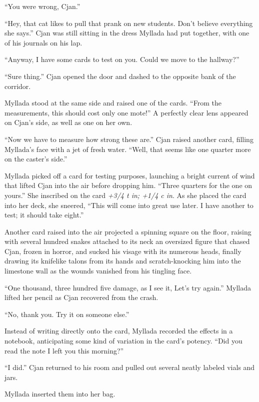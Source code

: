 \centeredstars

``You were wrong, Cjan.''

``Hey, that cat likes to pull that prank on new students. Don't believe everything she says.'' Cjan was still sitting in the dress Myllada had put together, with one of his journals on his lap.

``Anyway, I have some cards to test on you. Could we move to the hallway?''

``Sure thing.'' Cjan opened the door and dashed to the opposite bank of the corridor.

Myllada stood at the same side and raised one of the cards. ``From the measurements, this should cost only one mote!'' A perfectly clear lens appeared on Cjan's side, as well as one on her own.

``Now we have to measure how strong these are.'' Cjan raised another card, filling Myllada's face with a jet of fresh water. ``Well, that seems like one quarter more on the caster's side.''

Myllada picked off a card for testing purposes, launching a bright current of wind that lifted Cjan into the air before dropping him. ``Three quarters for the one on yours.'' She inscribed on the card \emph{+3/4 t in; +1/4 c in}. As she placed the card into her deck, she sneered, ``This will come into great use later. I have another to test; it should take eight.''

Another card raised into the air projected a spinning square on the floor, raising with several hundred snakes attached to its neck an oversized figure that chased Cjan, frozen in horror, and sucked his visage with its numerous heads, finally drawing its knifelike talons from its hands and scratch-knocking him into the limestone wall as the wounds vanished from his tingling face.

``One thousand, three hundred five damage, as I see it, Let's try again.'' Myllada lifted her pencil as Cjan recovered from the crash.

``No, thank you. Try it on someone else.''

Instead of writing directly onto the card, Myllada recorded the effects in a notebook, anticipating some kind of variation in the card's potency. ``Did you read the note I left you this morning?''

``I did.'' Cjan returned to his room and pulled out several neatly labeled vials and jars.

Myllada inserted them into her bag.

